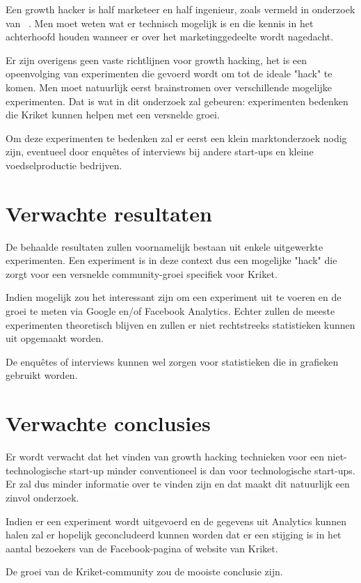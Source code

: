 Een growth hacker is half marketeer en half ingenieur, zoals vermeld in onderzoek van ~\cite{Lee2016}. Men moet weten wat er technisch mogelijk is en die kennis in het achterhoofd houden wanneer er over het marketinggedeelte wordt nagedacht. 

Er zijn overigens geen vaste richtlijnen voor growth hacking, het is een opeenvolging van experimenten die gevoerd wordt om tot de ideale "hack" te komen. Men moet natuurlijk eerst brainstromen over verschillende mogelijke experimenten. Dat is wat in dit onderzoek zal gebeuren: experimenten bedenken die Kriket kunnen helpen met een versnelde groei.

Om deze experimenten te bedenken zal er eerst een klein marktonderzoek nodig zijn, eventueel door enquêtes of interviews bij andere start-ups en kleine voedselproductie bedrijven. 


\section{Verwachte resultaten}
\label{sec:verwachte_resultaten}

De behaalde resultaten zullen voornamelijk bestaan uit enkele uitgewerkte experimenten. Een experiment is in deze context dus een mogelijke "hack" die zorgt voor een versnelde community-groei specifiek voor Kriket. 

Indien mogelijk zou het interessant zijn om een experiment uit te voeren en de groei te meten via Google en/of Facebook Analytics. Echter zullen de meeste experimenten theoretisch blijven en zullen er niet rechtstreeks statistieken kunnen uit opgemaakt worden.

De enquêtes of interviews kunnen wel zorgen voor statistieken die in grafieken gebruikt worden.

\section{Verwachte conclusies}
\label{sec:verwachte_conclusies}

Er wordt verwacht dat het vinden van growth hacking technieken voor een niet-technologische start-up minder conventioneel is dan voor technologische start-ups. Er zal dus minder informatie over te vinden zijn en dat maakt dit natuurlijk een zinvol onderzoek.

Indien er een experiment wordt uitgevoerd en de gegevens uit Analytics kunnen halen zal er hopelijk geconcludeerd kunnen worden dat er een stijging is in het aantal bezoekers van de Facebook-pagina of website van Kriket.

De groei van de Kriket-community zou de mooiste conclusie zijn.

